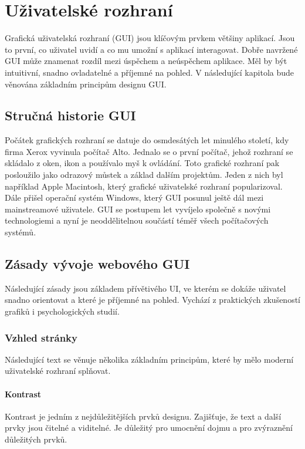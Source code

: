 \chapter{Uživatelské rozhraní}
Grafická uživatelská rozhraní (GUI) jsou klíčovým prvkem většiny aplikací. Jsou to první, co uživatel uvidí a co mu umožní s aplikací interagovat. Dobře navržené GUI může znamenat rozdíl mezi úspěchem a neúspěchem aplikace. Měl by být intuitivní, snadno ovladatelné a příjemné na pohled. V následující kapitola bude věnována základním principům designu GUI.

\section{Stručná historie GUI}
Počátek grafických rozhraní se datuje do osmdesátých let minulého století, kdy firma Xerox vyvinula počítač Alto. Jednalo se o první počítač, jehož rozhraní se skládalo z oken, ikon a používalo myš k ovládání. Toto grafické rozhraní pak posloužilo jako odrazový můstek a základ dalším projektům. Jeden z nich byl například Apple Macintosh, který grafické uživatelské rozhraní popularizoval. Dále přišel operační systém Windows, který GUI posunul ještě dál mezi mainstreamové uživatele. GUI se postupem let vyvíjelo společně s novými technologiemi a nyní je neoddělitelnou součástí téměř všech počítačových systémů.

\section{Zásady vývoje webového GUI}
Následující zásady jsou základem přívětivého UI, ve kterém se dokáže uživatel snadno orientovat a které je příjemné na pohled. Vychází z praktických zkušeností grafiků i psychologických studií.

\subsection{Vzhled stránky}
Následující text se věnuje několika základním principům, které by mělo moderní uživatelské rozhraní splňovat.\cite{principles_of_design}

\subsubsection*{Kontrast}
Kontrast je jedním z nejdůležitějších prvků designu. Zajišťuje, že text a další prvky jsou čitelné a viditelné. Je důležitý pro umocnění dojmu a pro zvýraznění důležitých prvků.


